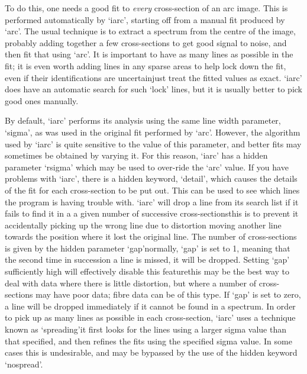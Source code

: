    To do this, one needs a good fit to {\em every\/}
   cross-section of an arc image.  This is performed automatically by
   `iarc', starting off from a manual fit produced by `arc'.  The usual
   technique is to extract a spectrum from the centre of the image,
   probably adding together a few cross-sections to get good signal to
   noise, and then fit that using `arc'.  It is important to have as
   many lines as possible in the fit; it is even worth adding lines in
   any sparse areas to help lock down the fit, even if their
   identifications are uncertain\latorhtm{---}{-}just treat the fitted
   values as
   exact.  `iarc' does have an automatic search for such `lock' lines,
   but it is usually better to pick good ones manually.

   By default, `iarc' performs its analysis using the same line width
   parameter, `sigma', as was used in the original fit performed by
   `arc'. However, the algorithm used by `iarc' is quite sensitive to
   the value of this parameter, and better fits may sometimes be
   obtained by varying it.  For this reason, `iarc' has a hidden
   parameter `rsigma' which may be used to over-ride the `arc' value.
   If you have problems with `iarc', there is a hidden keyword,
   `detail', which causes the details of the fit for each cross-section
   to be put out.  This can be used to see which lines the program is
   having trouble with.  `iarc' will drop a line from its search list if
   it fails to find it in a a given number of successive
   cross-sections\latorhtm{---}{-}this is to prevent it accidentally picking
   up the wrong line due to
   distortion moving another line towards the position where it lost the
   original line.  The number of cross-sections is given by the hidden
   parameter `gap'\latorhtm{---}{-}normally, `gap' is set to 1, meaning that
   the second time in succession a line is missed, it will be dropped.
   Setting `gap' sufficiently high will effectively disable this
   feature\latorhtm{---}{-}this may be the best way to deal with data
   where there is little
   distortion, but where a number of cross-sections may have poor data;
   fibre data can be of this type. If `gap' is set to zero, a line will
   be dropped immediately if it cannot be found in a spectrum. In order
   to pick up as many lines as possible in each cross-section, `iarc'
   uses a technique known as `spreading'\latorhtm{---}{-}it first looks for
   the lines
   using a larger sigma value than that specified, and then refines the
   fits using the specified sigma value.  In some cases this is
   undesirable, and may be bypassed by the use of the hidden keyword
   `nospread'.

